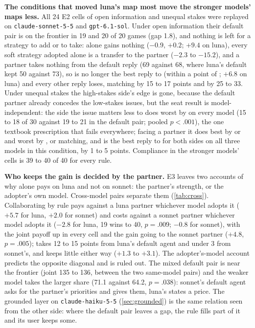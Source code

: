 \textbf{The conditions that moved luna's map most move the stronger models' maps less.} All 24 E2 cells of open information and unequal stakes were replayed on \texttt{claude-sonnet-5-5} and \texttt{gpt-6.1-sol}. Under open information their default pair is on the frontier in 19 and 20 of 20 games (gap 1.8), and nothing is left for a strategy to add or to take: \competing{} alone gains nothing ($-0.9$, $+0.2$; $+9.4$ on luna), every soft strategy adopted alone is a transfer to the partner ($-2.3$ to $-15.2$), and a \competing{} partner takes nothing from the default reply (69 against 68, where luna's default kept 50 against 73), so \collaborating{} is no longer the best reply to \competing{} (within a point of \neutral; $+6.8$ on luna) and every other reply loses, matching by 15 to 17 points and \avoiding{} by 25 to 33. Under unequal stakes the high-stakes side's \collaborating{} edge is gone, because the default partner already concedes the low-stakes issues, but the seat result is model-independent: the side the issue matters less to does worst by \accommodating{} on every model (15 to 18 of 30 against 19 to 21 in the default pair; pooled $p < .001$), the one textbook prescription that fails everywhere; facing a \competing{} partner it does best by \collaborating{} or \neutral{} and worst by \avoiding, \accommodating{} or matching, and \collaborating{} is the best reply to \competing{} for both sides on all three models in this condition, by 1 to 5 points. Compliance in the stronger models' cells is 39 to 40 of 40 for every rule.

\textbf{Who keeps the gain is decided by the partner.} E3 leaves two accounts of why \collaborating{} alone pays on luna and not on sonnet: the partner's strength, or the adopter's own model. Cross-model pairs separate them (\cref{tab:cross}). Collaborating by rule pays against a luna partner whichever model adopts it ($+5.7$ for luna, $+2.0$ for sonnet) and costs against a sonnet partner whichever model adopts it ($-2.8$ for luna, 19 wins to 40, $p = .009$; $-0.8$ for sonnet), with the joint payoff up in every cell and the gain going to the sonnet partner ($+4.8$, $p = .005$); \competing{} takes 12 to 15 points from luna's default agent and under 3 from sonnet's, and keeps little either way ($+1.3$ to $+3.1$). The adopter's-model account predicts the opposite diagonal and is ruled out. The mixed default pair is near the frontier (joint 135 to 136, between the two same-model pairs) and the weaker model takes the larger share (71.1 against 64.2, $p = .038$): sonnet's default agent asks for the partner's priorities and gives them, luna's states a price. The grounded layer on \texttt{claude-haiku-5-5} (\cref{sec:grounded}) is the same relation seen from the other side: where the default pair leaves a gap, the rule fills part of it and its user keeps some.

